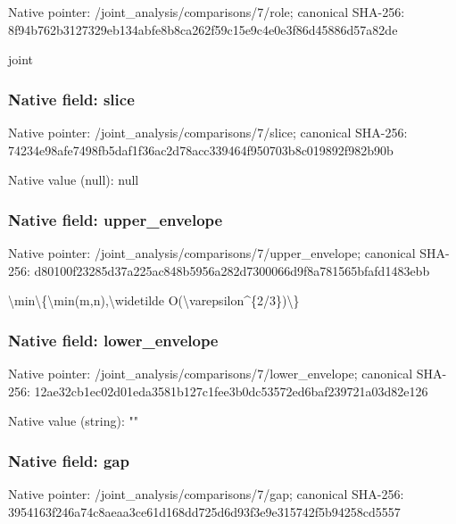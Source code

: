 \documentclass[10pt,a4paper]{article}
\begin{document}
Native pointer: /joint\_analysis/comparisons/7/role; canonical SHA-256: 8f94b762b3127329eb134abf\allowbreak{}e8b8ca262f59c15e9c4e0e3f\allowbreak{}86d45886d57a82de


joint


\subsubsection{Native field: slice}


Native pointer: /joint\_analysis/comparisons/7/slice; canonical SHA-256: 74234e98afe7498fb5daf1f3\allowbreak{}6ac2d78acc339464f950703b\allowbreak{}8c019892f982b90b



Native value (null): null



\subsubsection{Native field: upper\_envelope}


Native pointer: /joint\_analysis/comparis\allowbreak{}ons/7/upper\_envelope; canonical SHA-256: d80100f23285d37a225ac848\allowbreak{}b5956a282d7300066d9f8a78\allowbreak{}1565bfafd1483ebb


\textbackslash{}min\textbackslash{}\{\textbackslash{}min(m,n),\textbackslash{}widetilde O(\textbackslash{}varepsilon\textasciicircum{}\{2/3\})\textbackslash{}\}


\subsubsection{Native field: lower\_envelope}


Native pointer: /joint\_analysis/comparis\allowbreak{}ons/7/lower\_envelope; canonical SHA-256: 12ae32cb1ec02d01eda3581b\allowbreak{}127c1fee3b0dc53572ed6baf\allowbreak{}239721a03d82e126



Native value (string): ""



\subsubsection{Native field: gap}


Native pointer: /joint\_analysis/comparisons/7/gap; canonical SHA-256: 3954163f246a74c8aeaa3ce6\allowbreak{}1d168dd725d6d93f3e9e3157\allowbreak{}42f5b94258cd5557
\end{document}
